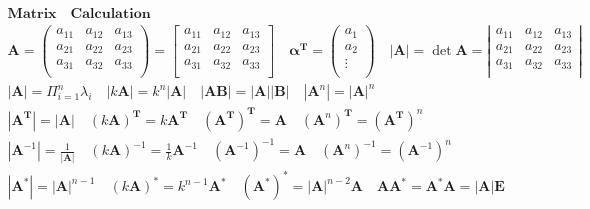 \documentclass{article}
\begin{document}
\begin{align*}
    \bm{Matrix \quad Calculation} \\  
    \mathbf{A} = \left(
        \begin{array}{ccc}
            a_{11} & a_{12} & a_{13} \\ 
            a_{21} & a_{22} & a_{23} \\ 
            a_{31} & a_{32} & a_{33} \\  
        \end{array}
    \right) =  
    \begin{bmatrix} 
        a_{11} & a_{12} & a_{13} \\ 
        a_{21} & a_{22} & a_{23} \\ 
        a_{31} & a_{32} & a_{33} \\  
    \end{bmatrix} 
    \quad 
    \mathbf{\alpha^{T}} = \left(
        \begin{array}{c}
            a_{1} \\
            a_{2} \\  
            \vdots \\ 
         \end{array}
    \right) \quad 
    |\mathbf{A}| =\det \mathbf{A} = \left|
    \begin{array}{ccc}
        a_{11} & a_{12} & a_{13} \\ 
        a_{21} & a_{22} & a_{23} \\ 
        a_{31} & a_{32} & a_{33} \\  
    \end{array}
    \right| \\ 
    |\mathbf{A}| = \Pi_{i=1}^n{\lambda_{i}} \quad |k \mathbf{A}| = k^{n}|\mathbf{A}| \quad |\mathbf{A}\mathbf{B}|=|\mathbf{A}||\mathbf{B}| \quad |\mathbf{A}^{n}|=|\mathbf{A}|^{n}\\
    |\mathbf{A}^{\mathbf{T}}| = |\mathbf{A}| \quad (k\mathbf{A})^{\mathbf{T}} = k\mathbf{A}^{\mathbf{T}} \quad (\mathbf{A}^{\mathbf{T}})^{\mathbf{T}} = \mathbf{A} \quad (\mathbf{A}^{n})^{\mathbf{T}} = (\mathbf{A}^{\mathbf{T}})^{n}\\  
    |\mathbf{A}^{-1}| = \frac{1}{|\mathbf{A}|} \quad (k\mathbf{A})^{-1} = \frac{1}{k}\mathbf{A}^{-1} \quad (\mathbf{A}^{-1})^{-1} = \mathbf{A} \quad (\mathbf{A}^{n})^{-1} = (\mathbf{A}^{-1})^{n}\\
    |\mathbf{A}^{*}| = |\mathbf{A}|^{n-1} \quad (k\mathbf{A})^{*} = k^{n-1}\mathbf{A}^{*} \quad (\mathbf{A}^{*})^{*} = |\mathbf{A}|^{n-2}\mathbf{A} \quad \mathbf{A}\mathbf{A}^{*} = \mathbf{A}^{*}\mathbf{A} = |\mathbf{A}|\mathbf{E}\\ 

\end{align*}
\end{document}
